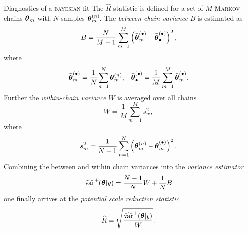 \documentclass[11pt,aspectratio=169,dvipsnames]{beamer}
\begin{document}
	\begin{frame}[allowframebreaks]{Diagnostics of a \textsc{bayesian} fit}
	The $\widehat{R}$-statistic is defined for a set of $M$ \textsc{Markov} chains $\boldsymbol{\theta}_m$ with $N$ samples $\boldsymbol{\theta}_m^{(n)}$. The \emph{between-chain-variance} $B$ is estimated as \begin{equation*}
		B=\frac{N}{M-1}\sum_{m=1}^{M}\left(\bar{\boldsymbol{\theta}}_m^{(\bullet)}-\bar{\boldsymbol{\theta}}^{(\bullet)}_\bullet\right)^2,
	\end{equation*}
	where
	\begin{align*}
		\bar{\boldsymbol{\theta}}_m^{(\bullet)}=\frac{1}{N}\sum_{n=1}^{N}\boldsymbol{\theta}_m^{(n)}, && \bar{\boldsymbol{\theta}}^{(\bullet)}_\bullet=\frac{1}{M}\sum_{m=1}^{M}\bar{\boldsymbol{\theta}}_m^{(\bullet)}. 
	\end{align*}
	Further the \emph{within-chain variance} $W$ is averaged over all chains
	\begin{equation*}
		W=\frac{1}{M}\sum_{m=1}^{M}s_m^2,
	\end{equation*}
	where \begin{equation*}
		s_m^2=\frac{1}{N-1}\sum_{n=1}^{N}\left(\boldsymbol{\theta}_m^{(n)}-\bar{\boldsymbol{\theta}}_m^{(\bullet)}\right)^2.
	\end{equation*}
	Combining the between and within chain variances into the \emph{variance estimator}
	\begin{equation*}
		\widehat{\text{var}}^+(\boldsymbol{\theta}|y)=\frac{N-1}{N}W+\frac{1}{N}B
	\end{equation*}
	one finally arrives at the \emph{potential scale reduction statistic}
	\begin{equation*}
		\widehat{R}=\sqrt{\frac{\widehat{\text{var}}^+(\boldsymbol{\theta}|y)}{W}}.
	\end{equation*} 
\end{frame}
\end{document}
